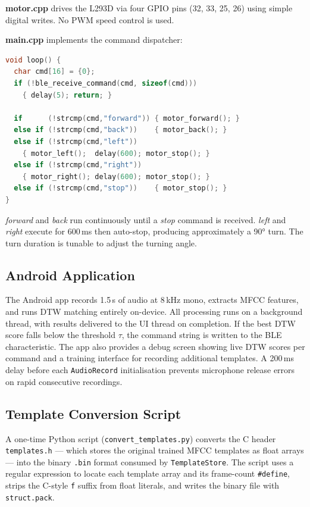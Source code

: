 \documentclass[conference]{IEEEtran}
\begin{document}
\textbf{motor.cpp} drives the L293D via four GPIO pins (32, 33, 25, 26)
using simple digital writes. No PWM speed control is used.

\textbf{main.cpp} implements the command dispatcher:

\begin{lstlisting}[language=C++, caption={ESP32 command dispatcher (main.cpp)}]
void loop() {
  char cmd[16] = {0};
  if (!ble_receive_command(cmd, sizeof(cmd)))
    { delay(5); return; }

  if      (!strcmp(cmd,"forward")) { motor_forward(); }
  else if (!strcmp(cmd,"back"))    { motor_back(); }
  else if (!strcmp(cmd,"left"))
    { motor_left();  delay(600); motor_stop(); }
  else if (!strcmp(cmd,"right"))
    { motor_right(); delay(600); motor_stop(); }
  else if (!strcmp(cmd,"stop"))    { motor_stop(); }
}
\end{lstlisting}

\textit{forward} and \textit{back} run continuously until a \textit{stop}
command is received. \textit{left} and \textit{right} execute for 600\,ms
then auto-stop, producing approximately a 90° turn. The turn duration
is tunable to adjust the turning angle.

\subsection{Android Application}
The Android app records 1.5\,s of audio at 8\,kHz mono, extracts
MFCC features, and runs DTW matching entirely on-device. All
processing runs on a background thread, with results delivered to
the UI thread on completion. If the best DTW score falls below the
threshold $\tau$, the command string is written to the BLE
characteristic. The app also provides a debug screen showing live
DTW scores per command and a training interface for recording
additional templates. A 200\,ms delay before each \texttt{AudioRecord}
initialisation prevents microphone release errors on rapid consecutive
recordings.

\subsection{Template Conversion Script}
A one-time Python script (\texttt{convert\_templates.py}) converts the
C header \texttt{templates.h} — which stores the original trained
MFCC templates as float arrays — into the binary \texttt{.bin} format
consumed by \texttt{TemplateStore}. The script uses a regular expression
to locate each template array and its frame-count \texttt{\#define},
strips the C-style \texttt{f} suffix from float literals, and writes
the binary file with \texttt{struct.pack}.
\end{document}
